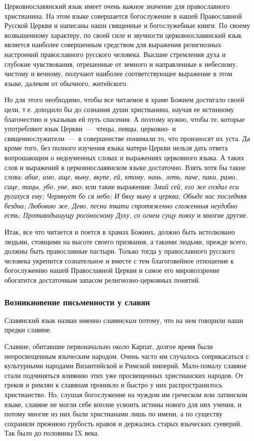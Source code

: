 \documentclass[11pt,a4paper,oneside]{memoir}
\begin{document}
    Церковнославянский язык имеет очень важное значение для православного христианина. На этом языке совершается богослужение в нашей Православной Русской Церкви и написаны наши священные и богослужебные книги. По своему возвышенному характеру, по своей силе и звучности церковнославянский язык является наиболее совершенным средством для выражения религиозных настроений православного русского человека. Высшие стремления духа и глубокие чувствования, отрешенные от земного и направленные к небесному, чистому и вечному, получают наиболее соответствующее выражение в этом языке, далеком от обычного, житейского.
    
    Но для этого необходимо, чтобы все читаемое в храме Божием достигало своей цели, т.е. доходило бы до сознания души христианина, научая ее истинному благочестию и указывая ей путь спасения. А поэтому нужно, чтобы те, которые употребляют язык Церкви~---~чтецы, певцы, церковно- и священнослужители~---~в совершенстве понимали то, что произносят их уста. Да кроме того, без полного изучения языка матери-Церкви нельзя дать ответа вопрошающим о недоуменных словах и выражениях церковного языка. А таких слов и выражений в церковнославянском языке достаточно. Взять хотя бы такие слова: \emph{абие, амо, аще, выну, вкупе, ей, ктому, нань, леть, паче, паки, рамо, сице, тацы, убо, уне, яко}; или такие выражения: \emph{Змий сей, его же создал еси ругахуся ему; Чермнует бо ся небо; И бяху выну в церкви; Обыде нас последняя бездна; Любовию же, Дево, песни ткати спротяженно сложенныя неудобно есть; Противодышущу росоносному Духу, со огнем сущу пояху} и многие другие.
    
    Итак, все что читается и поется в храмах Божиих, должно быть истолковано людьми, стоящими на высоте своего призвания, а такими людьми, прежде всего, должны быть православные пастыри. Только тогда у православного русского человека укрепится сознательное и вместе с тем благоговейное отношение к богослужению нашей Православной Церкви и самое его мировоззрение обогатится достаточным запасом религиозно-церковных понятий.
    
                \subsubsection{Возникновение письменности у славян}
                
    Славянский язык назван именно \emph{славянским} потому, что на нем говорили наши предки славяне.
    
    Славяне, обитавшие первоначально около Карпат, долгое время были непросвещенным языческим народом. Очень часто им случалось соприкасаться с культурными народами Византийской и Римской империй. Мало-помалу славяне стали подчиняться влиянию этих уже просвещенных христианских народов. От греков и римлян к славянам проникло и быстро у них распространилось христианство. Но, слушая богослужение на чуждом им греческом или латинском языке, славяне не могли себе вполне усвоить истины нового для них учения, и потому многие из них были христианами лишь по имени, а по существу сохраняли прежнюю грубость нравов и держались старых языческих суеверий. Так было до половины IX века.
    
\end{document}
